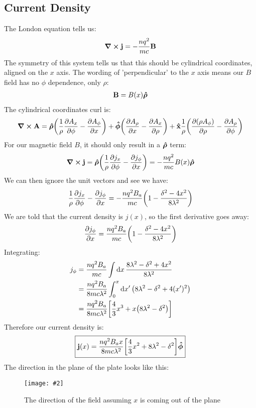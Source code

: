 \documentclass[12pt]{article}
\newcommand{\fig}[3]
{
  \begin{figure}[H]
    \centering
    \texttt{[image: \#2]}
    \caption{#3}
  \end{figure}
}
\begin{document}
\subsection{Current Density}
The London equation tells us:
\begin{align*}
  \curl{\vb{j}}=-\frac{nq^2}{mc}\vb{B}
\end{align*}
The symmetry of this system tells us that this should be cylindrical coordinates, aligned on the $x$ axis. The wording of 'perpendicular' to the $x$ axis means our $B$ field has no $\phi$ dependence, only $\rho$:
\begin{align*}
  \vb{B}=B(x)\vu{\bm{\rho}}
\end{align*}
The cylindrical coordinates curl is:
\begin{align*}
  \curl{\vb{A}}=\vu{\bm{\rho}}\qty(\frac1\rho\pdv{A_x}{\phi}-\pdv{A_\phi}{x})
  +\vu{\bm{\phi}}\qty(\pdv{A_\rho}{x}-\pdv{A_x}{\rho})
  +\vu{x}\frac1\rho\qty(\pdv{(\rho A_\phi)}{\rho}-\pdv{A_\rho}{\phi})
\end{align*}
For our magnetic field $B$, it should only result in a $\vu{\bm{\rho}}$ term:
\begin{align*}
  \curl\vb{j}=\vu{\bm{\rho}}\qty(\frac1\rho\pdv{j_x}{\phi}-\pdv{j_\phi}{x})=
  -\frac{nq^2}{mc}B(x)\vu{\bm{\rho}}
\end{align*}
We can then ignore the unit vectors and see we have:
\begin{align*}
  \frac1\rho\pdv{j_x}{\phi}-\pdv{j_\phi}{x}=-\frac{nq^2B_a}{mc}
  \qty(1-\frac{\delta^2-4x^2}{8\lambda^2})
\end{align*}
We are told that the current density is $j(x)$, so the first derivative goes away:
\begin{align*}
  \pdv{j_\phi}{x}=\frac{nq^2B_a}{mc}\qty(1-\frac{\delta^2-4x^2}{8\lambda^2})
\end{align*}
Integrating:
\begin{align*}
  j_\phi&=\frac{nq^2B_a}{mc}\int\dd{x}\frac{8\lambda^2-\delta^2+4x^2}
  {8\lambda^2}\\ &=\frac{nq^2B_a}{8mc\lambda^2}
  \int_0^x\dd{x'}\qty(8\lambda^2-\delta^2+4(x')^2)\\
  &=\frac{nq^2B_a}{8mc\lambda^2}\qty[\frac43x^3+x\qty(8\lambda^2-\delta^2)]
\end{align*}
Therefore our current density is:
\begin{align*}
  \boxed{\vb{j}(x)=\frac{nq^2B_ax}{8mc\lambda^2}
  \qty[\frac43x^2+8\lambda^2-\delta^2]\vu{\bm{\phi}}}
\end{align*}
The direction in the plane of the plate looks like this:
\fig{10.0}{phihat}{The direction of the field assuming $x$ is coming out of the plane}
\end{document}

